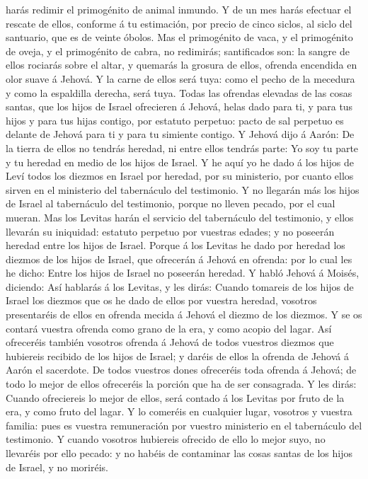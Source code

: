 harás redimir el primogénito de animal inmundo.  Y de un
mes harás efectuar el rescate de ellos, conforme á tu estimación, por
precio de cinco siclos, al siclo del santuario, que es de veinte óbolos.
 Mas el primogénito de vaca, y el primogénito de oveja, y
el primogénito de cabra, no redimirás; santificados son: la sangre de
ellos rociarás sobre el altar, y quemarás la grosura de ellos, ofrenda
encendida en olor suave á Jehová.  Y la carne de ellos será
tuya: como el pecho de la mecedura y como la espaldilla derecha, será
tuya.  Todas las ofrendas elevadas de las cosas santas, que
los hijos de Israel ofrecieren á Jehová, helas dado para ti, y para tus
hijos y para tus hijas contigo, por estatuto perpetuo: pacto de sal
perpetuo es delante de Jehová para ti y para tu simiente contigo.
 Y Jehová dijo á Aarón: De la tierra de ellos no tendrás
heredad, ni entre ellos tendrás parte: Yo soy tu parte y tu heredad en
medio de los hijos de Israel.  Y he aquí yo he dado á los
hijos de Leví todos los diezmos en Israel por heredad, por su
ministerio, por cuanto ellos sirven en el ministerio del tabernáculo del
testimonio.  Y no llegarán más los hijos de Israel al
tabernáculo del testimonio, porque no lleven pecado, por el cual mueran.
 Mas los Levitas harán el servicio del tabernáculo del
testimonio, y ellos llevarán su iniquidad: estatuto perpetuo por
vuestras edades; y no poseerán heredad entre los hijos de Israel.
 Porque á los Levitas he dado por heredad los diezmos de
los hijos de Israel, que ofrecerán á Jehová en ofrenda: por lo cual les
he dicho: Entre los hijos de Israel no poseerán heredad.  Y
habló Jehová á Moisés, diciendo:  Así hablarás á los
Levitas, y les dirás: Cuando tomareis de los hijos de Israel los diezmos
que os he dado de ellos por vuestra heredad, vosotros presentaréis de
ellos en ofrenda mecida á Jehová el diezmo de los diezmos. 
Y se os contará vuestra ofrenda como grano de la era, y como acopio del
lagar.  Así ofreceréis también vosotros ofrenda á Jehová de
todos vuestros diezmos que hubiereis recibido de los hijos de Israel; y
daréis de ellos la ofrenda de Jehová á Aarón el sacerdote. 
De todos vuestros dones ofreceréis toda ofrenda á Jehová; de todo lo
mejor de ellos ofreceréis la porción que ha de ser consagrada.
 Y les dirás: Cuando ofreciereis lo mejor de ellos, será
contado á los Levitas por fruto de la era, y como fruto del lagar.
 Y lo comeréis en cualquier lugar, vosotros y vuestra
familia: pues es vuestra remuneración por vuestro ministerio en el
tabernáculo del testimonio.  Y cuando vosotros hubiereis
ofrecido de ello lo mejor suyo, no llevaréis por ello pecado: y no
habéis de contaminar las cosas santas de los hijos de Israel, y no
moriréis.

